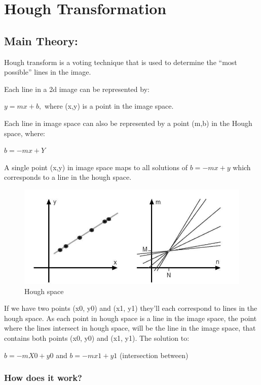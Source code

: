 \section{Hough Transformation}

\subsection{Main Theory:}

Hough transform is a voting technique that is used to determine the
``most possible'' lines in the image.

Each line in a 2d image can be represented by:

$y=mx+b,$ where (x,y) is a point in the image space.

Each line in image space can also be represented by a point (m,b) in the
Hough space, where:

$b = -mx + Y$

A single point (x,y) in image space maps to all solutions of
$b = -mx + y$ which corresponds to a line in the hough space.

\begin{figure}[htbp]
\centering
\includegraphics{pics/hough/1.jpg}
\caption{Hough space \label{hough1}}
\end{figure}

If we have two points (x0, y0) and (x1, y1) they'll each correspond to
lines in the hough space. As each point in hough space is a line in the
image space, the point where the lines intersect in hough space, will be
the line in the image space, that contains both points (x0, y0) and (x1,
y1). The solution to:

$b = -mX0 + y0$ and $b = -mx1 + y1$ (intersection between)

\subsubsection{How does it work?}

